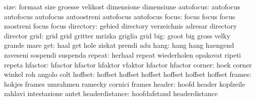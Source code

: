                      size: formaat                   size
                           groesse                   velikost
                           dimensione                dimensiune
                autofocus: autofocus                 autofocus
                           autofocus                 autoostreni
                           autofocus                 autofocus
                    focus: focus                     focus
                           focus                     zaostreni
                           focus                     focus %
                directory: gebied                    directory
                           verzeichnis               adresar
                           directory                 director
                     grid: grid                      grid
                           gritter                   mrizka
                           griglia                   grid
                      big: groot                     big
                           gross                     velky
                           grande                    mare
                      get: haal                      get
                           hole                      ziskat
                           prendi                    adu
                     hang: hang                      hang
                           haengend                  zaveseni
                           sospendi                  suspenda
                   repeat: herhaal                   repeat
                           wiederholen               opakovat
                           ripeti                    repeta
                  hfactor: hfactor                   hfactor
                           hfaktor                   vfaktor
                           hfactor                   hfactor  %
                   corner: hoek                      corner
                           winkel                    roh
                           angolo                    colt
                  hoffset: hoffset                   hoffset
                           hoffset                   hoffset
                           hoffset                   hoffset %
                   frames: hokjes                    frames
                           umrahmen                  ramecky
                           cornici                   frames
                   header: hoofd                     header
                           kopfzeile                 zahlavi
                           intestazione              antet
           headerdistance: hoofdafstand              headerdistance
